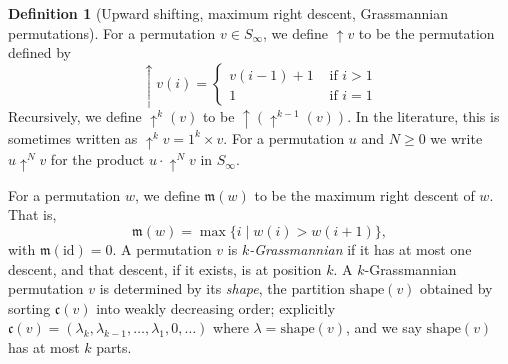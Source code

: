 \documentclass{amsart}
\theoremstyle{definition}
\newtheorem{definition}[lemma]{Definition}
\theoremstyle{remark}
\numberwithin{equation}{subsection}
\newcommand{\shup}{{\uparrow}}
\newcommand{\code}{\mathfrak{c}}
\newcommand{\maxd}{\mathfrak{m}}
\begin{document}
\begin{definition}[Upward shifting, maximum right descent, Grassmannian permutations]
For a permutation $v\in S_\infty$, we define $\shup{v}$ to be the permutation defined by
$$\shup{v}(i) = \begin{cases}
	v(i-1)+1&\mbox{ if }i>1\\
	1&\mbox{ if }i=1
\end{cases}$$
Recursively, we define $\shup^k(v)$ to be $\shup(\shup^{k-1}(v))$. In the literature, this is sometimes written as $\shup^kv = 1^k\times v$. For a permutation $u$ and $N\geq 0$ we write $u\shup^N v$ for the product $u\cdot\shup^N v$ in $S_\infty$.

For a permutation $w$, we define $\maxd(w)$ to be the maximum right descent of $w$. That is,
$$\maxd(w) = \max\{i\mid w(i)>w(i+1)\},$$
with $\maxd(\mathrm{id})=0$. A permutation $v$ is \emph{$k$-Grassmannian} if it has at most one descent, and that descent, if it exists, is at position $k$. A $k$-Grassmannian permutation $v$ is determined by its \emph{shape}, the partition $\mathrm{shape}(v)$ obtained by sorting $\code(v)$ into weakly decreasing order; explicitly $\code(v) = (\lambda_k,\lambda_{k-1},\ldots,\lambda_1,0,\ldots)$ where $\lambda=\mathrm{shape}(v)$, and we say $\mathrm{shape}(v)$ has at most $k$ parts.
\end{definition}
\end{document}
